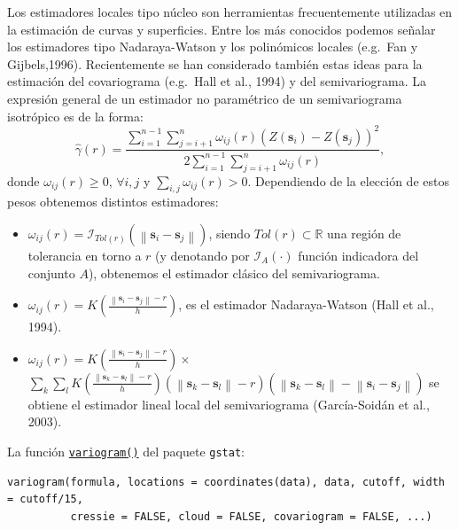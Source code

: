 \documentclass[
  spanish,
]{book}
\providecommand{\tightlist}{%
  \setlength{\itemsep}{0pt}\setlength{\parskip}{0pt}}
\theoremstyle{break}
\theoremstyle{definition}
\theoremstyle{definition}
\theoremstyle{definition}
\theoremstyle{definition}
\theoremstyle{remark}
\begin{document}
Los estimadores locales tipo núcleo son herramientas frecuentemente utilizadas en la estimación de curvas y superficies.
Entre los más conocidos podemos señalar los estimadores tipo Nadaraya-Watson y los polinómicos locales (e.g.~Fan y Gijbels,1996).
Recientemente se han considerado también estas ideas para la estimación del covariograma (e.g.~Hall et al., 1994) y del semivariograma.
La expresión general de un estimador no paramétrico de un semivariograma isotrópico es de la forma:
\[\hat{\gamma}(r) = \dfrac{\sum\limits_{i=1}^{n-1}\sum\limits_{j=i+1}^{n}\omega_{ij}
(r)\left( Z(\mathbf{s}_{i})-Z(\mathbf{s}_{j})\right)^2  
}{2\sum\limits_{i=1}^{n-1}\sum\limits_{j=i+1}^{n}\omega_{ij}(r)},\]
donde \(\omega_{ij}(r) \geq 0\), \(\forall i,j\) y \(\sum_{i,j}\omega_{ij}(r) > 0\).
Dependiendo de la elección de estos pesos obtenemos distintos estimadores:

\begin{itemize}
\tightlist
\item
  \(\omega_{ij}(r) = \mathcal{I}_{Tol(r)} \left( \left\| \mathbf{s}_{i} - \mathbf{s}_{j} \right\| \right)\), siendo \(Tol(r)\subset \mathbb{R}\) una región de tolerancia en torno a \(r\) (y denotando por \(\mathcal{I}_{A}(\cdot)\) función indicadora del conjunto \(A\)), obtenemos el estimador clásico del semivariograma.
\item
  \(\omega_{ij}(r)=K\left( \frac{\left\| \mathbf{s}_{i} -\mathbf{s}_{j} \right\| -r}{h} \right)\), es el estimador Nadaraya-Watson (Hall et al., 1994).
\item
  \(\omega_{ij}(r)=K\left( \frac{\left\| \mathbf{s}_{i} -\mathbf{s}_{j} \right\| -r}{h} \right) \times\) \(\sum\limits_{k}\sum\limits_{l}K\left( \frac{\left\| \mathbf{s}_{k} -\mathbf{s}_{l} \right\| -r}{h} \right) \left( \left\| \mathbf{s}_{k} -\mathbf{s}_{l} \right\| -r\right) \left( \left\| \mathbf{s}_{k} -\mathbf{s}_{l} \right\| -\left\| \mathbf{s}_{i} -\mathbf{s}_{j} \right\| \right)\) se obtiene el estimador lineal local del semivariograma (García-Soidán et al., 2003).
\end{itemize}

La función \href{https://r-spatial.github.io/gstat/reference/variogram.html}{\texttt{variogram()}} del paquete \texttt{gstat}:

\begin{verbatim}
variogram(formula, locations = coordinates(data), data, cutoff, width = cutoff/15,
          cressie = FALSE, cloud = FALSE, covariogram = FALSE, ...)
\end{verbatim}
\end{document}
